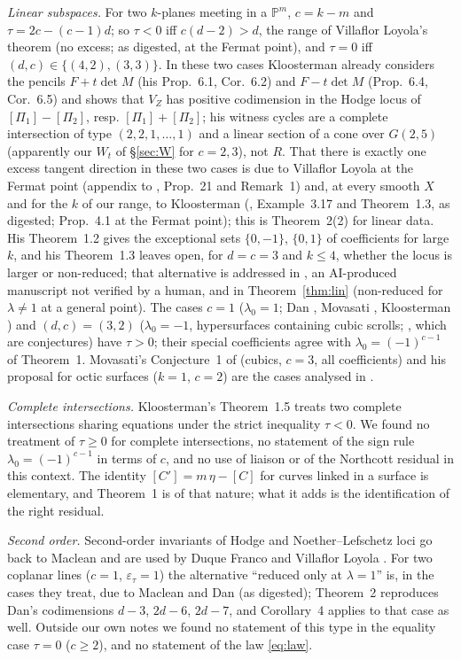 \documentclass[11pt]{article}
\numberwithin{equation}{section}
\theoremstyle{remark}
\newcommand{\PP}{\mathbb{P}}
\newcommand{\VZ}{V_Z}
\newcommand{\lz}{\lambda_0}
\newcommand{\et}{\varepsilon_\tau}
\begin{document}
\emph{Linear subspaces.} For two $k$-planes meeting in a $\PP^m$, $c=k-m$ and $\tau=2c-(c-1)d$; so $\tau<0$ iff
$c(d-2)>d$, the range of Villaflor Loyola's theorem \cite{VL} (no excess; as digested, at the Fermat point), and
$\tau=0$ iff
$(d,c)\in\{(4,2),(3,3)\}$. In these two cases Kloosterman \cite[\S6]{Kl} already considers the pencils
$F+t\det M$ (his Prop.~6.1, Cor.~6.2) and $F-t\det M$ (Prop.~6.4, Cor.~6.5) and shows that $\VZ$ has positive
codimension in the Hodge locus of $[\Pi_1]-[\Pi_2]$, resp. $[\Pi_1]+[\Pi_2]$; his witness cycles are a complete
intersection of type $(2,2,1,\dots,1)$ and a linear section of a cone over $G(2,5)$ (apparently our $W_t$ of
\S\ref{sec:W} for $c=2,3$), not $R$. That there is exactly one excess tangent direction in these two cases is
due to Villaflor Loyola at the Fermat point (appendix to \cite{Mo}, Prop.~21 and Remark~1) and, at every smooth
$X$ and for the $k$ of our range, to Kloosterman (\cite{Kl}, Example~3.17 and Theorem~1.3, as digested; Prop.~4.1
at the Fermat point); this is Theorem~2(2) for linear data. His
Theorem~1.2 gives the exceptional sets $\{0,-1\}$, $\{0,1\}$ of coefficients for large $k$, and his Theorem~1.3
leaves open, for $d=c=3$ and $k\le4$, whether the locus is larger or non-reduced; that alternative is addressed
in \cite{P1}, an AI-produced manuscript not verified by a human, and in Theorem~\ref{thm:lin} (non-reduced for
$\lambda\ne1$ at a general point). The cases $c=1$ ($\lz=1$; Dan \cite{Dan2}, Movasati \cite{Mo}, Kloosterman \cite{Kl2}) and $(d,c)=(3,2)$
($\lz=-1$, hypersurfaces containing cubic scrolls; \cite[Conj.~6, 7]{Mo}, which are conjectures) have $\tau>0$;
their special coefficients agree with $\lz=(-1)^{c-1}$ of Theorem~1. Movasati's Conjecture~1 of \cite{Mo}
(cubics, $c=3$, all coefficients) and his proposal for octic surfaces \cite{Mo26} ($k=1$, $c=2$) are the cases
analysed in \cite{P1,P2}.

\emph{Complete intersections.} Kloosterman's Theorem~1.5 \cite{Kl} treats two complete intersections sharing
equations under the strict inequality $\tau<0$. We found no treatment of $\tau\ge0$ for complete intersections,
no statement of the sign rule $\lz=(-1)^{c-1}$ in terms of $c$, and no use of liaison or of the Northcott
residual in this context. The identity $[C']=m\,\eta-[C]$ for curves linked in a surface is elementary, and
Theorem~1 is of that nature; what it adds is the identification of the right residual.

\emph{Second order.} Second-order invariants of Hodge and Noether--Lefschetz loci go back to Maclean
\cite{Mac} and are used by Duque Franco and Villaflor Loyola \cite{DFV1}. For two coplanar lines ($c=1$,
$\et=1$) the alternative ``reduced only at $\lambda=1$'' is, in the cases they treat, due to Maclean and Dan
\cite{Dan1,Dan2} (as digested); Theorem~2 reproduces Dan's codimensions $d-3$, $2d-6$, $2d-7$, and Corollary~4 applies to that case
as well. Outside our own notes we found no statement of this type in the equality case $\tau=0$ ($c\ge2$), and no
statement of the law \eqref{eq:law}.
\end{document}
